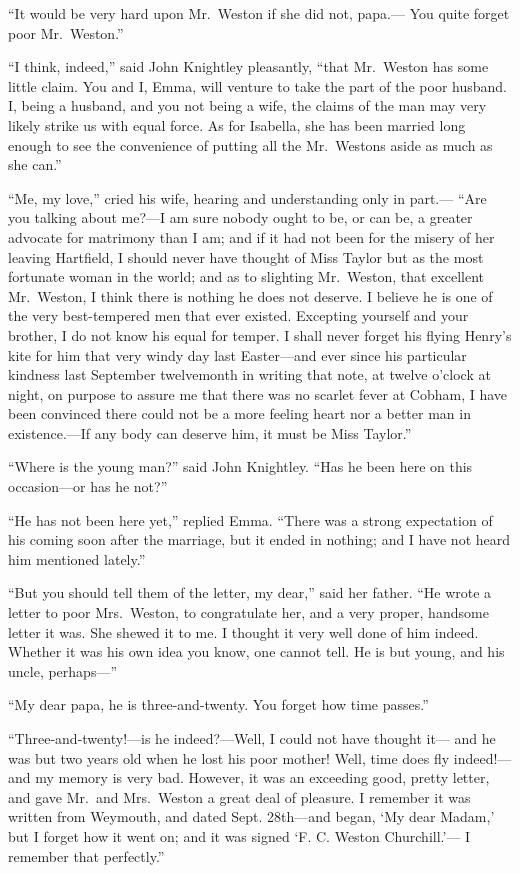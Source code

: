 ``It would be very hard upon Mr.\ Weston if she did not, papa.---%
You quite forget poor Mr.\ Weston.''

``I think, indeed,'' said John Knightley pleasantly, ``that Mr.\ Weston
has some little claim.  You and I, Emma, will venture to take the part
of the poor husband.  I, being a husband, and you not being a wife,
the claims of the man may very likely strike us with equal force.
As for Isabella, she has been married long enough to see the convenience
of putting all the Mr.\ Westons aside as much as she can.''

``Me, my love,'' cried his wife, hearing and understanding only in part.---%
``Are you talking about me?---I am sure nobody ought to be, or can be,
a greater advocate for matrimony than I am; and if it had not been
for the misery of her leaving Hartfield, I should never have thought
of Miss Taylor but as the most fortunate woman in the world;
and as to slighting Mr.\ Weston, that excellent Mr.\ Weston, I think
there is nothing he does not deserve.  I believe he is one of the
very best-tempered men that ever existed.  Excepting yourself
and your brother, I do not know his equal for temper.  I shall
never forget his flying Henry's kite for him that very windy day
last Easter---and ever since his particular kindness last September
twelvemonth in writing that note, at twelve o'clock at night,
on purpose to assure me that there was no scarlet fever at Cobham,
I have been convinced there could not be a more feeling heart nor
a better man in existence.---If any body can deserve him, it must be
Miss Taylor.''

``Where is the young man?'' said John Knightley.  ``Has he been here
on this occasion---or has he not?''

``He has not been here yet,'' replied Emma.  ``There was a strong
expectation of his coming soon after the marriage, but it ended
in nothing; and I have not heard him mentioned lately.''

``But you should tell them of the letter, my dear,'' said her father.
``He wrote a letter to poor Mrs.\ Weston, to congratulate her,
and a very proper, handsome letter it was.  She shewed it to me.
I thought it very well done of him indeed.  Whether it was his own idea
you know, one cannot tell.  He is but young, and his uncle, perhaps---''

``My dear papa, he is three-and-twenty. You forget how time passes.''

``Three-and-twenty!---is he indeed?---Well, I could not have thought it---%
and he was but two years old when he lost his poor mother!  Well,
time does fly indeed!---and my memory is very bad.  However, it was
an exceeding good, pretty letter, and gave Mr.\ and Mrs.\ Weston
a great deal of pleasure.  I remember it was written from Weymouth,
and dated Sept. 28th---and began, `My dear Madam,' but I forget
how it went on; and it was signed `F. C. Weston Churchill.'---%
I remember that perfectly.''

